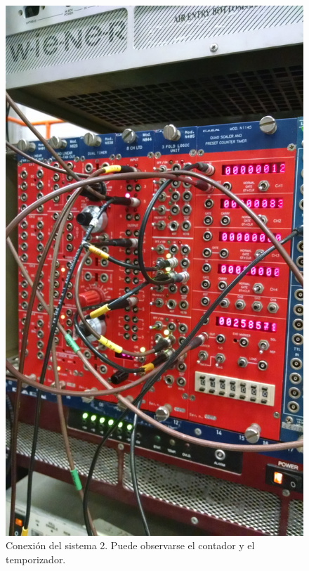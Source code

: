 \documentclass[a4paper,10pt]{article}
\numberwithin{equation}{section}
\begin{document}
\begin{figure}[H]
 \center 
 \includegraphics[scale=0.13]{Imagenes/sistema2}
 \caption{Conexión del sistema 2. Puede observarse el contador y el temporizador.}
\end{figure}
\end{document}
